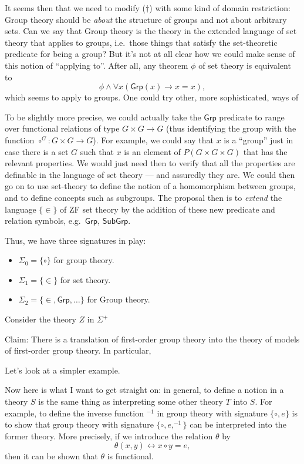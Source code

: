 \documentclass[12pt,fleqn]{article}
\begin{document}

It seems then that we need to modify ($\dagger$) with some kind of
domain restriction: Group theory should be \emph{about} the structure
of groups and not about arbitrary sets. Can we say that Group theory
is the theory in the extended language of set theory that applies to
groups, i.e.\ those things that satisfy the set-theoretic predicate
for being a group? But it's not at all clear how we could make sense
of this notion of ``applying to''. After all, any theorem $\phi$ of
set theory is equivalent to
\[ \phi\wedge \forall x(\mathsf{Grp}(x)\to x=x) , \] which seems to
apply to groups. One could try other, more sophisticated, ways of 

To be slightly more precise, we could actually take the $\mathsf{Grp}$
predicate to range over functional relations of type $G\times G\to G$
(thus identifying the group with the function
$\circ ^G:G\times G\to G$). For example, we could say that $x$ is a
``group'' just in case there is a set $G$ such that $x$ is an element
of $P(G\times G\times G)$ that has the relevant properties. We would
just need then to verify that all the properties are definable in the
language of set theory --- and assuredly they are.  We could then go
on to use set-theory to define the notion of a homomorphism between
groups, and to define concepts such as subgroups. The proposal then is
to \emph{extend} the language $\{ \in \}$ of ZF set theory by the
addition of these new predicate and relation symbols, e.g.\
$\mathsf{Grp}$, $\mathsf{SubGrp}$.

Thus, we have three signatures in play:
\begin{itemize} \item $\Sigma _0= \{ \circ \}$ for group theory.
\item $\Sigma _1=\{\in \}$ for set theory.
\item $\Sigma _2=\{\in ,\mathsf{Grp},\dots \}$ for Group theory.
\end{itemize}

Consider the theory $Z$ in $\Sigma ^+$ 



Claim: There is a translation of first-order group theory into the
theory of models of first-order group theory. In particular, 

Let's look at a simpler example.

Now here is what I want to get straight on: in general, to define a
notion in a theory $S$ is the same thing as interpreting some other
theory $T$ into $S$. For example, to define the inverse function
$^{-1}$ in group theory with signature $\{ \circ ,e\}$ is to show that
group theory with signature $\{ \circ ,e,^{-1} \}$ can be interpreted
into the former theory. More precisely, if we introduce the relation
$\theta$ by 
\[ \theta (x,y) \leftrightarrow x\circ y = e ,\] then it can be shown
that $\theta$ is functional.
\end{document}
